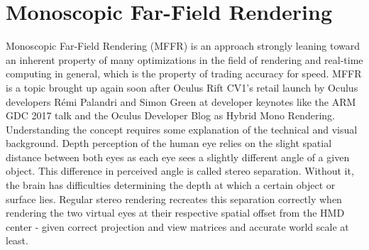 
\section{Monoscopic Far-Field Rendering} \label{MFFR}
Monoscopic Far-Field Rendering (\gls{MFFR}) is an approach strongly leaning toward an inherent property of many optimizations in the field of rendering and real-time computing in general, which is the property of trading accuracy for speed. \gls{MFFR} is a topic brought up again soon after Oculus Rift CV1's retail launch by Oculus developers Rémi Palandri and Simon Green at developer keynotes like the ARM GDC 2017 talk\cite{DiDonato.01.03.2017} and the Oculus Developer Blog as Hybrid Mono Rendering\cite{Palandri.2016}. \\
Understanding the concept requires some explanation of the technical and visual background. Depth perception of the human eye relies on the slight spatial distance between both eyes as each eye sees a slightly different angle of a given object. This difference in perceived angle is called stereo separation. Without it, the brain has difficulties determining the depth at which a certain object or surface lies. Regular stereo rendering recreates this separation correctly when rendering the two virtual eyes at their respective spatial offset from the \gls{HMD} center - given correct projection and view matrices and accurate world scale at least. \\

